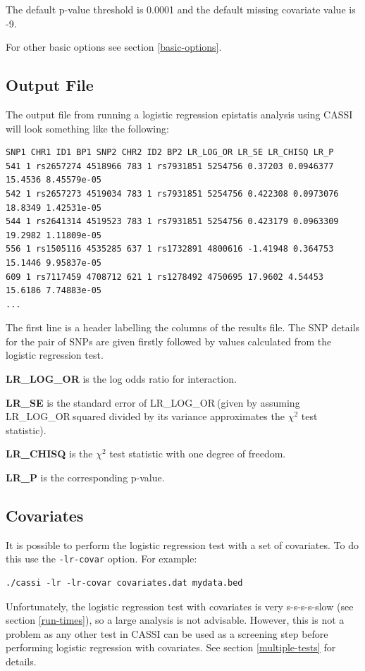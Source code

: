 \documentclass[a4paper,12pt]{article}
\newcommand{\code}[1]{{\footnotesize{{\tt #1}}}}
\begin{document}
The default p-value threshold is 0.0001 and the default missing covariate value is -9. 

For other basic options see  section \ref{basic-options}. 


\subsection{Output File}
\label{lr-output}

The output file from running a logistic regression epistatis analysis using CASSI will look something like the following: 
\vspace{0.35cm} \begin{lstlisting}
SNP1 CHR1 ID1 BP1 SNP2 CHR2 ID2 BP2 LR_LOG_OR LR_SE LR_CHISQ LR_P
541 1 rs2657274 4518966 783 1 rs7931851 5254756 0.37203 0.0946377 15.4536 8.45579e-05
542 1 rs2657273 4519034 783 1 rs7931851 5254756 0.422308 0.0973076 18.8349 1.42531e-05
544 1 rs2641314 4519523 783 1 rs7931851 5254756 0.423179 0.0963309 19.2982 1.11809e-05
556 1 rs1505116 4535285 637 1 rs1732891 4800616 -1.41948 0.364753 15.1446 9.95837e-05
609 1 rs7117459 4708712 621 1 rs1278492 4750695 17.9602 4.54453 15.6186 7.74883e-05
...

\end{lstlisting} \vspace{0.35cm}
The first line is a header labelling the columns of the results file. The SNP details for the pair of SNPs are given firstly followed by values calculated from the logistic regression test. 

{\bf LR\_LOG\_OR} is the log odds ratio for interaction. 

{\bf LR\_SE} is the standard error of LR\_LOG\_OR$\:$(given by assuming LR\_LOG\_OR$\:$squared divided by its variance approximates the $\chi^2$ test statistic). 

{\bf LR\_CHISQ} is the $\chi^2$ test statistic with one degree of freedom. 

{\bf LR\_P} is the corresponding p-value. 


\subsection{Covariates}
\label{covariates}

It is possible to perform the logistic regression test with a set of covariates. To do this use the \code{-lr-covar} option. For example: 
\vspace{0.35cm} \begin{lstlisting}
./cassi -lr -lr-covar covariates.dat mydata.bed

\end{lstlisting} \vspace{0.35cm}
Unfortunately, the logistic regression test with covariates is very s-s-s-s-slow (see  section \ref{run-times}), so a large analysis is not advisable. However, this is not a problem as any other test in CASSI can be used as a screening step before performing logistic regression with covariates. See  section \ref{multiple-tests} for details. 
\end{document}
